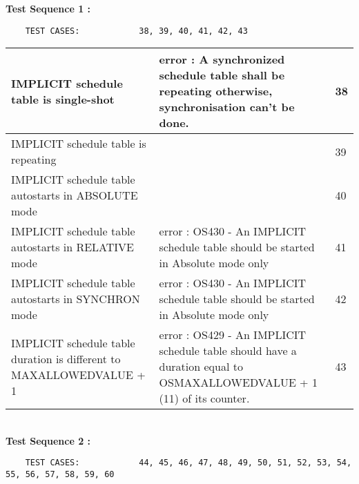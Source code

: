 \documentclass[10pt]{article}
\newlength{\Li}\settowidth{\Li}{Running}
\newlength{\Lii}\setlength{\Lii}{7cm}
\newlength{\Liiii}\setlength{\Liiii}{0.9cm}
\newlength{\Liii}\setlength{\Liii}{\textwidth} \addtolength{\Liii}{-\Li} \addtolength{\Liii}{-\Lii} \addtolength{\Liii}{-\Liiii}
\begin{document}
	\textbf{Test Sequence 1 :}
	\begin{lstlisting}
	TEST CASES:		       38, 39, 40, 41, 42, 43
	\end{lstlisting}
	

	\begin{supertabular}{|p{\Li}|p{\Lii}|p{\Liii}|} \hline 
	IMPLICIT schedule table is single-shot 								& error : A synchronized schedule table shall be repeating otherwise, synchronisation can't be done.	& 38 \\ \hline
	IMPLICIT schedule table is repeating		 						&  					& 39 \\ \hline
	IMPLICIT schedule table autostarts in ABSOLUTE mode					&  					& 40 \\ \hline
	IMPLICIT schedule table autostarts in RELATIVE mode					& error : OS430 - An IMPLICIT schedule table should be started in Absolute mode only				& 41 \\ \hline
	IMPLICIT schedule table autostarts in SYNCHRON mode				& error : OS430 - An IMPLICIT schedule table should be started in Absolute mode only				& 42 \\ \hline
	IMPLICIT schedule table duration is different to MAXALLOWEDVALUE + 1	& error : OS429 - An IMPLICIT schedule table should have a duration equal to OSMAXALLOWEDVALUE + 1 (11) of its counter.				& 43 \\ \hline
	\end{supertabular}\\
	
	\textbf{Test Sequence 2 :}
	\begin{lstlisting}
	TEST CASES:		       44, 45, 46, 47, 48, 49, 50, 51, 52, 53, 54, 55, 56, 57, 58, 59, 60
	\end{lstlisting}
	
\end{document}
